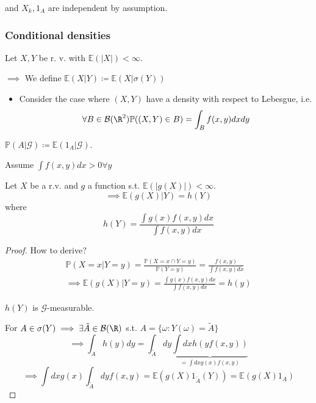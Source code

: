 and $X_k, 1_A$ are independent by assumption.

\subsubsection{Conditional densities}

\begin{definition}
    Let $X,Y$ be r. v. with $\mathbb{E}(|X|)<\infty$.
    
    $\implies$ We define $\mathbb{E}(X|Y)\coloneqq \mathbb{E}(X|\sigma(Y))$
\end{definition}

\begin{itemize}
    \item Consider the case where $(X,Y)$ have a density with respect to Lebesgue, i.e.
    \[\forall B\in\mathcal{B}(\R^2)\mathbb{P}((X,Y)\in B)=\int_B f(x,y)dxdy\]
\end{itemize}

\begin{remark}
    $\mathbb{P}(A|\mathcal{G})\coloneqq \mathbb{E}(1_A|\mathcal{G})$.
\end{remark}

Assume $\int f(x,y) dx >0 \forall y$

\begin{proposition}
    Let $X$ be a r.v. and $g$ a function s.t. $\mathbb{E}(|g(X)|)<\infty$.
    \[\implies \mathbb{E}(g(X)|Y)=h(Y)\]
    where \[h(Y)=\frac{\int g(x) f(x,y) dx}{\int f(x,y)dx}\]
\end{proposition}

\begin{proof}
    How to derive?
    \begin{align*}
        \mathbb{P}(X=x|Y=y)=\frac{\mathbb{P}(X=x\cap Y=y)}{\mathbb{P}(Y=y)}=\frac{f(x,y)}{\int f(x,y)dx}\\
        \implies \mathbb{E}(g(X)|Y=y)=\frac{\int g(x)f(x,y)dx}{\int f(x,y)dx}=h(y)
    \end{align*}    

    $h(Y)$ is $\mathcal{G}$-measurable.

    For $A\in \sigma(Y)\implies \exists \tilde{A}\in\mathcal{B}(\R)$ s.t. $A=\{\omega:Y(\omega)=\tilde{A}\}$
    \[\implies \int_A h(y)dy=\int_{\tilde{A}} dy \underbrace{\int dx h(y f(x,y))}_{=\int dx g(x) f(x,y)}\]
    \[\implies \int dx g(x)\int_{\tilde{A}} dy f(x,y)=\mathbb{E}(g(X)1_{\tilde{A}}(Y))=\mathbb{E}(g(X)1_A)\]

\end{proof}


